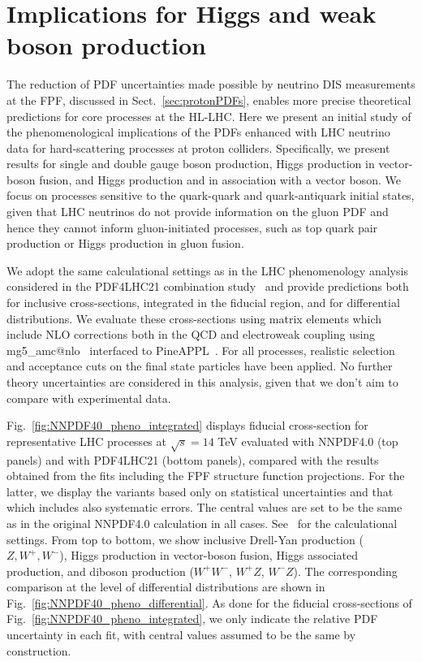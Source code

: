 \section{Implications for Higgs and weak boson production}
\label{sec:pheno}

The reduction of PDF uncertainties made possible by neutrino DIS measurements
at the FPF, discussed in Sect.~\ref{sec:protonPDFs},
enables more precise theoretical predictions for core processes at the
HL-LHC.
%
Here we present an initial study of the phenomenological implications
of the PDFs enhanced with LHC neutrino data
for hard-scattering processes at proton colliders.
%
Specifically, we present results for 
single and double gauge boson production,  Higgs production in
vector-boson fusion, and Higgs production and in association with a vector boson.
%
We focus on processes sensitive to the quark-quark and quark-antiquark initial
states, given that LHC neutrinos do not provide information on the gluon
PDF and hence they cannot inform  gluon-initiated
processes, such as top quark pair production or Higgs production in gluon fusion.

We adopt the same calculational settings as in the LHC phenomenology analysis considered
in the PDF4LHC21 combination study~\cite{PDF4LHCWorkingGroup:2022cjn} and provide predictions
both for inclusive cross-sections, integrated in the fiducial
region, and for differential distributions.
%
We evaluate these cross-sections using matrix elements
which include NLO corrections both in the
QCD and electroweak coupling using
{\sc\small mg5\_amc@nlo}~\cite{Frederix:2018nkq}
interfaced to {\sc\small PineAPPL}~\cite{Carrazza:2020gss}.
%
For all processes, realistic selection and acceptance cuts on the final state particles
have been applied.
%
No further theory uncertainties are considered in this
analysis, given that we don't aim to compare with experimental data.

Fig.~\ref{fig:NNPDF40_pheno_integrated} displays
fiducial cross-section for representative LHC processes at $\sqrt{s}=14$ TeV
evaluated with NNPDF4.0 (top panels)
and with PDF4LHC21 (bottom panels),
compared with the results obtained from
the fits including the FPF structure function projections.
%
For the latter, we display the variants based only on statistical uncertainties and that
which includes also systematic errors.
%
The central values are set to be the same as in the original NNPDF4.0 calculation in all cases.
%
See~\cite{NNPDF:2021njg} for the calculational settings.
%
From top to bottom, we show inclusive Drell-Yan production ($Z, W^+, W^-$), Higgs production
in vector-boson fusion, Higgs associated
production, and diboson production ($W^+W^-$, $W^+Z$, $W^-Z$).
%
The corresponding comparison at the level of differential distributions
are shown in Fig.~\ref{fig:NNPDF40_pheno_differential}.
%
As done for the fiducial cross-sections of Fig.~\ref{fig:NNPDF40_pheno_integrated},
we only indicate the relative PDF uncertainty in each fit, with central values
assumed to be the same by construction.


